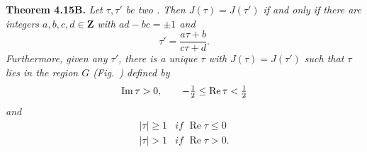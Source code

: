 {\medskip
\noindent\hypertarget{result-IV-4.15B}{}\textbf{Theorem 4.15B.} \emph{Let $\tau,\tau'$ be two . Then $J(\tau)=J(\tau')$ if and only if there are integers $a,b,c,d\in\mathbf Z$ with $ad-bc=\pm1$ and}
\[
\tau'=\frac{a\tau+b}{c\tau+d}.
\]
\noindent\emph{Furthermore, given any $\tau'$, there is a unique $\tau$ with $J(\tau)=J(\tau')$ such that $\tau$ lies in the region $G$ \textup{(Fig.~)} defined by}
\[
\operatorname{Im}\tau>0,\qquad
-\tfrac12\le\operatorname{Re}\tau<\tfrac12
\]
\noindent\emph{and}
\[
\begin{array}{ll}
|\tau|\ge1&\textit{if }\operatorname{Re}\tau\le0\\
|\tau|>1&\textit{if }\operatorname{Re}\tau>0.
\end{array}
\]
}
